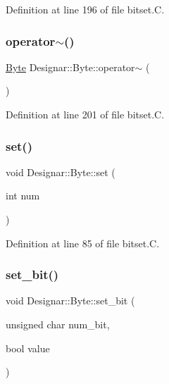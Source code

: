 Definition at line 196 of file bitset.\+C.

\mbox{\label{class_designar_1_1_byte_ab59ded3274a3c5fc0b719deaada0f581}} 
\subsubsection{\texorpdfstring{operator$\sim$()}{operator~()}}
{\footnotesize\ttfamily \hyperlink{class_designar_1_1_byte}{Byte} Designar\+::\+Byte\+::operator$\sim$ (\begin{DoxyParamCaption}{ }\end{DoxyParamCaption})}



Definition at line 201 of file bitset.\+C.

\mbox{\label{class_designar_1_1_byte_a4e4336c19295313fc80e27ce40a69284}} 
\subsubsection{\texorpdfstring{set()}{set()}}
{\footnotesize\ttfamily void Designar\+::\+Byte\+::set (\begin{DoxyParamCaption}\item[{int}]{num }\end{DoxyParamCaption})}



Definition at line 85 of file bitset.\+C.

\mbox{\label{class_designar_1_1_byte_a2d80ae64ad8316128d9217134f075721}} 
\subsubsection{\texorpdfstring{set\+\_\+bit()}{set\_bit()}}
{\footnotesize\ttfamily void Designar\+::\+Byte\+::set\+\_\+bit (\begin{DoxyParamCaption}\item[{unsigned char}]{num\+\_\+bit,  }\item[{bool}]{value }\end{DoxyParamCaption})}



